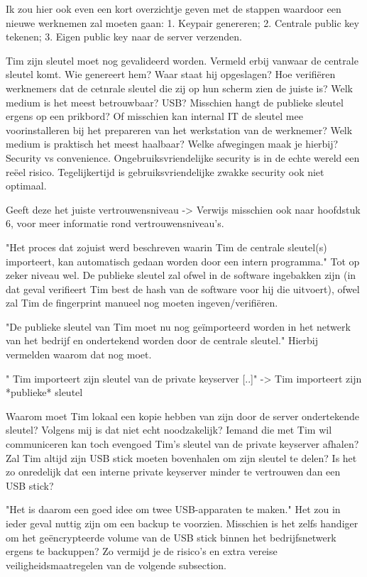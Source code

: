 Ik zou hier ook even een kort overzichtje geven met de stappen waardoor een
nieuwe werknemen zal moeten gaan:
1. Keypair genereren;
2. Centrale public key tekenen;
3. Eigen public key naar de server verzenden.

Tim zijn sleutel moet nog gevalideerd worden.  Vermeld erbij vanwaar de
centrale sleutel komt. Wie genereert hem? Waar staat hij opgeslagen? Hoe
verifiëren werknemers dat de cetnrale sleutel die zij op hun scherm zien de
juiste is? Welk medium is het meest betrouwbaar? USB? Misschien hangt de
publieke sleutel ergens op een prikbord? Of misschien kan internal IT de
sleutel mee voorinstalleren bij het prepareren van het werkstation van de
werknemer? Welk medium is praktisch het meest haalbaar? Welke afwegingen maak
je hierbij? Security vs convenience. Ongebruiksvriendelijke security is in de
echte wereld een reëel risico. Tegelijkertijd is gebruiksvriendelijke zwakke
security ook niet optimaal.

Geeft deze het juiste vertrouwensniveau -> Verwijs misschien ook naar hoofdstuk
6, voor meer informatie rond vertrouwensniveau's.

"Het proces dat zojuist werd beschreven waarin Tim de centrale sleutel(s)
importeert, kan automatisch gedaan worden door een intern programma." Tot op
zeker niveau wel. De publieke sleutel zal ofwel in de software ingebakken zijn
(in dat geval verifieert Tim best de hash van de software voor hij die
uitvoert), ofwel zal Tim de fingerprint manueel nog moeten ingeven/verifiëren.

"De publieke sleutel van Tim moet nu nog geïmporteerd worden in het netwerk van
het bedrijf en ondertekend worden door de centrale sleutel." Hierbij vermelden
waarom dat nog moet.

" Tim importeert zijn sleutel van de private keyserver [..]" -> Tim
importeert zijn *publieke* sleutel

Waarom moet Tim lokaal een kopie hebben van
zijn door de server ondertekende sleutel? Volgens mij is dat niet echt
noodzakelijk? Iemand die met Tim wil communiceren kan toch evengoed Tim's
sleutel van de private keyserver afhalen? Zal Tim altijd zijn USB stick moeten
bovenhalen om zijn sleutel te delen? Is het zo onredelijk dat een interne
private keyserver minder te vertrouwen dan een USB stick?

"Het is daarom een goed idee om twee USB-apparaten te maken." Het zou in
ieder geval nuttig zijn om een backup te voorzien. Misschien is het zelfs
handiger om het geëncrypteerde volume van de USB stick binnen het
bedrijfsnetwerk ergens te backuppen? Zo vermijd je de risico's en extra vereise
veiligheidsmaatregelen van de volgende subsection.

